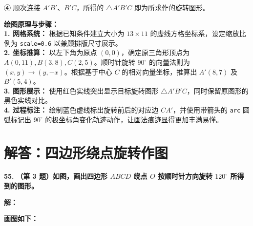 ④ 顺次连接 $A'B'$、$B'C$，所得的 $\triangle A'B'C$ 即为所求作的旋转图形。

\vspace{0.4cm}
{\small\color{blue!70!black}
\textbf{绘图原理与步骤：}\\
\textbf{1. 网格系统：} 根据已知条件建立大小为 $13 \times 11$ 的虚线方格坐标系，设定缩放比例为 \texttt{scale=0.6} 以兼顾排版尺寸展示。\\
\textbf{2. 坐标推算：} 以左下角为原点 $(0,0)$，确定原三角形顶点为 $A(0,11), B(3,8), C(2,5)$。顺时针旋转 $90^\circ$ 的向量法则为 $(x, y) \to (y, -x)$。根据基于中心 $C$ 的相对向量坐标，推算出 $A'(8, 7)$ 及 $B'(5, 4)$。\\
\textbf{3. 图形展示：} 使用红色实线突出显示目标旋转图形 $\triangle A'B'C$，同时保留原图形的黑色实线对比。\\
\textbf{4. 过程标注：} 绘制蓝色虚线标出旋转前后的对应边 $CA'$，并使用带箭头的 \texttt{arc} 圆弧标记出 $90^\circ$ 的极坐标角变化轨迹动作，让画法痕迹显得更加丰满易懂。
}

\newpage



\newpage

\section{解答：四边形绕点旋转作图}

\vspace{0.6cm}

\textbf{\LARGE 55.} \textbf{（第 3 题）如图，画出四边形 $ABCD$ 绕点 $O$ 按顺时针方向旋转 $120^\circ$ 所得到的图形。}

\vspace{0.4cm}
\textbf{解：}

\textbf{画图如下：}

